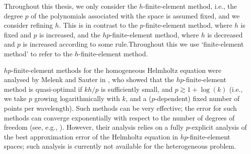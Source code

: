 


Throughout this thesis, we only consider the $h$-finite-element method, i.e., the degree $p$ of the polynomials associated with the space is assumed fixed, and we consider refining $h.$ This is in contrast to the $p$-finite-element method, where $h$ is fixed and $p$ is increased, and the $hp$-finite-element method, where $h$ is decreased and $p$ is increased according to some rule.Throughout this  we use `finite-element method' to refer to the $h$-finite-element method.

$hp$-finite-element methods for the homogeneous Helmholtz equation were analysed by Melenk and Sauter in \cite{MeSa:10,MeSa:11}, who showed that the $hp$-finite-element method is quasi-optimal if $kh/p$ is sufficiently small, and $p \gtrsim 1 + \log(k)$ (i.e., we take $p$ growing logarithmically with $k$, and a ($p$-dependent) fixed number of points per wavelength). Such methods can be very effective; the error for such methods can converge exponentially with respect to the number of degrees of freedom (see, e.g., \cite[Theorem 4.51]{Sc:98}). However, their analysis relies on a fully $p$-explicit analysis of the best approximation error of the Helmholtz equation in $hp$-finite-element spaces; such analysis is currently not available for the heterogeneous problem.
\ere


